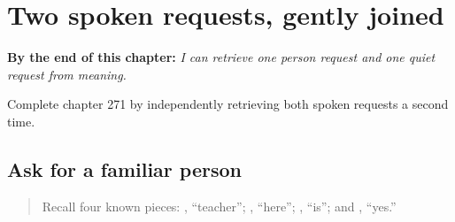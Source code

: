 
\chapter{Two spoken requests, gently joined}
\label{ch:sa-person-and-quiet-requests}

\begin{chapteropening}
\textbf{By the end of this chapter:} \emph{I can retrieve one person request and one quiet request from meaning.}

Complete chapter 271 by independently retrieving both spoken requests a second time.
\end{chapteropening}

\section[\texorpdfstring{\sk{अध्यापकः} \sk{अत्र} … (adhyāpakaḥ atra …)}{अध्यापकः अत्र … (adhyāpakaḥ atra …)}]{Ask for a familiar person}

\label{lesson:SA-C271-ask-for-a-person}



\begin{quote}
Recall four known pieces: \textbf{}, “teacher”; \textbf{}, “here”; \textbf{}, “is”; and \textbf{}, “yes.”
\end{quote}


